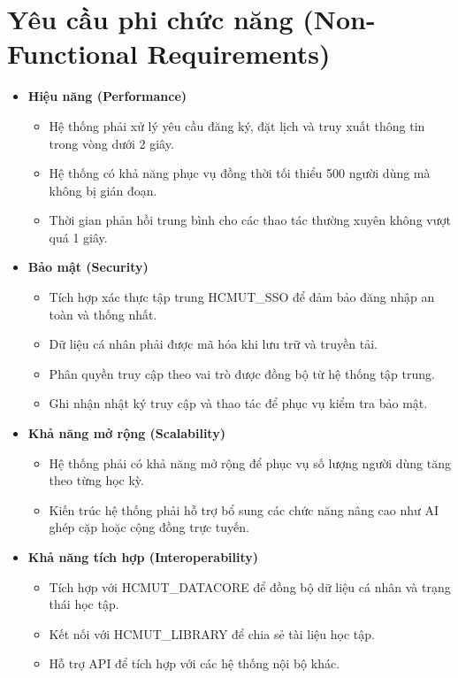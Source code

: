 \section{Yêu cầu phi chức năng (Non-Functional Requirements)}

\begin{itemize}
    \item \textbf{Hiệu năng (Performance)}
    \begin{itemize}
        \item Hệ thống phải xử lý yêu cầu đăng ký, đặt lịch và truy xuất thông tin trong vòng dưới 2 giây.
        \item Hệ thống có khả năng phục vụ đồng thời tối thiểu 500 người dùng mà không bị gián đoạn.
        \item Thời gian phản hồi trung bình cho các thao tác thường xuyên không vượt quá 1 giây.
    \end{itemize}

    \item \textbf{Bảo mật (Security)}
    \begin{itemize}
        \item Tích hợp xác thực tập trung HCMUT\_SSO để đảm bảo đăng nhập an toàn và thống nhất.
        \item Dữ liệu cá nhân phải được mã hóa khi lưu trữ và truyền tải.
        \item Phân quyền truy cập theo vai trò được đồng bộ từ hệ thống tập trung.
        \item Ghi nhận nhật ký truy cập và thao tác để phục vụ kiểm tra bảo mật.
    \end{itemize}

    \item \textbf{Khả năng mở rộng (Scalability)}
    \begin{itemize}
        \item Hệ thống phải có khả năng mở rộng để phục vụ số lượng người dùng tăng theo từng học kỳ.
        \item Kiến trúc hệ thống phải hỗ trợ bổ sung các chức năng nâng cao như AI ghép cặp hoặc cộng đồng trực tuyến.
    \end{itemize}

    \item \textbf{Khả năng tích hợp (Interoperability)}
    \begin{itemize}
        \item Tích hợp với HCMUT\_DATACORE để đồng bộ dữ liệu cá nhân và trạng thái học tập.
        \item Kết nối với HCMUT\_LIBRARY để chia sẻ tài liệu học tập.
        \item Hỗ trợ API để tích hợp với các hệ thống nội bộ khác.
    \end{itemize}


\end{itemize}
